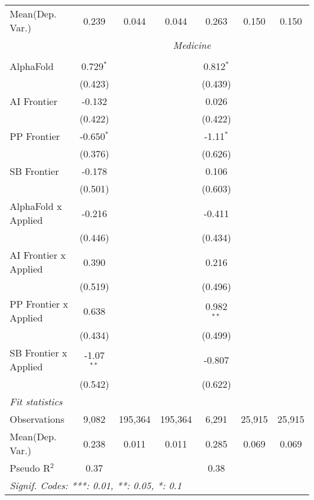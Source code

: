 \begin{tabular}{lcccccc}
Mean(Dep. Var.) & 0.239 & 0.044 & 0.044 & 0.263 & 0.150 & 0.150 \\
 & \multicolumn{6}{c}{\textit{Medicine}} \\ \\
   AlphaFold             & 0.729$^{*}$  &         &         & 0.812$^{*}$  &        &   \\   
                         & (0.423)      &         &         & (0.439)      &        &   \\   
   AI Frontier           & -0.132       &         &         & 0.026        &        &   \\   
                         & (0.422)      &         &         & (0.422)      &        &   \\   
   PP Frontier           & -0.650$^{*}$ &         &         & -1.11$^{*}$  &        &   \\   
                         & (0.376)      &         &         & (0.626)      &        &   \\   
   SB Frontier           & -0.178       &         &         & 0.106        &        &   \\   
                         & (0.501)      &         &         & (0.603)      &        &   \\   
   AlphaFold x Applied   & -0.216       &         &         & -0.411       &        &   \\   
                         & (0.446)      &         &         & (0.434)      &        &   \\   
   AI Frontier x Applied & 0.390        &         &         & 0.216        &        &   \\   
                         & (0.519)      &         &         & (0.496)      &        &   \\   
   PP Frontier x Applied & 0.638        &         &         & 0.982$^{**}$ &        &   \\   
                         & (0.434)      &         &         & (0.499)      &        &   \\   
   SB Frontier x Applied & -1.07$^{**}$ &         &         & -0.807       &        &   \\   
                         & (0.542)      &         &         & (0.622)      &        &   \\   
   \midrule
   \emph{Fit statistics}\\
   Observations          & 9,082        & 195,364 & 195,364 & 6,291        & 25,915 & 25,915\\  
Mean(Dep. Var.) & 0.238 & 0.011 & 0.011 & 0.285 & 0.069 & 0.069 \\
   Pseudo R$^2$          & 0.37         &         &         & 0.38         &        & \\  
   \midrule \midrule
   \multicolumn{7}{l}{\emph{Signif. Codes: ***: 0.01, **: 0.05, *: 0.1}}\\
\end{tabular}
\par\endgroup
